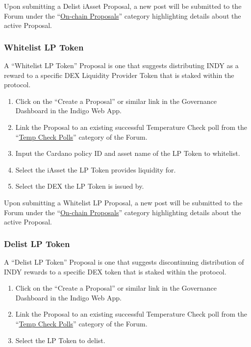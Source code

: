 Upon submitting a Delist iAsset Proposal, a new post will be submitted
to the Forum under the
``\href{https://forum.indigoprotocol.io/c/proposals/6}{On-chain
Proposals}'' category highlighting details about the active Proposal.

\hypertarget{whitelist-lp-token}{%
\subsubsection{Whitelist LP Token}\label{whitelist-lp-token}}

A ``Whitelist LP Token'' Proposal is one that suggests distributing INDY
as a reward to a specific DEX Liquidity Provider Token that is staked
within the protocol.

\begin{enumerate}
\item
  Click on the ``Create a Proposal'' or similar link in the Governance
  Dashboard in the Indigo Web App.
\item
  Link the Proposal to an existing successful Temperature Check poll
  from the ``\href{https://forum.indigoprotocol.io/c/polls/11}{Temp
  Check Polls}'' category of the Forum.
\item
  Input the Cardano policy ID and asset name of the LP Token to
  whitelist.
\item
  Select the iAsset the LP Token provides liquidity for.
\item
  Select the DEX the LP Token is issued by.
\end{enumerate}

Upon submitting a Whitelist LP Proposal, a new post will be submitted to
the Forum under the
``\href{https://forum.indigoprotocol.io/c/proposals/6}{On-chain
Proposals}'' category highlighting details about the active Proposal.

\hypertarget{delist-lp-token}{%
\subsubsection{Delist LP Token}\label{delist-lp-token}}

A ``Delist LP Token'' Proposal is one that suggests discontinuing
distribution of INDY rewards to a specific DEX token that is staked
within the protocol.

\begin{enumerate}
\item
  Click on the ``Create a Proposal'' or similar link in the Governance
  Dashboard in the Indigo Web App.
\item
  Link the Proposal to an existing successful Temperature Check poll
  from the ``\href{https://forum.indigoprotocol.io/c/polls/11}{Temp
  Check Polls}'' category of the Forum.
\item
  Select the LP Token to delist.
\end{enumerate}

